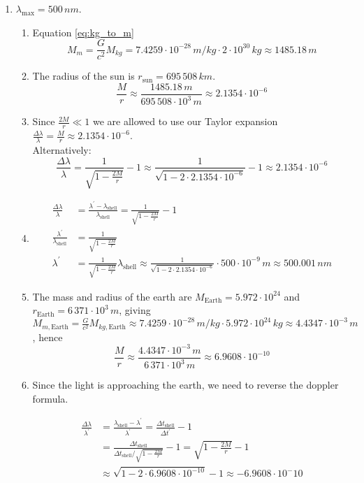 \documentclass[a4paper,10pt,english]{article}
\begin{document}
\begin{enumerate}
\item $\lambda_{\text{max}}=500\,nm$.

\begin{enumerate}

\item Equation \ref{eq:kg_to_m} \[M_{m}=\frac{G}{c^{2}}M_{kg}=7.4259\cdot10^{-28}\,m/kg\cdot2\cdot10^{30}\,kg\approx1485.18\,m\]

\item The radius of the sun is $r_{\text{sun}}=695\,508\,km$. \[\frac{M}{r}\approx\frac{1485.18\,m}{695\,508\cdot10^{3}\,m}\approx2.1354\cdot10^{-6}\]

\item Since $\frac{2M}{r}\ll 1$ we are allowed to use our Taylor expansion $\frac{\Delta \lambda}{\lambda}=\frac{M}{r}\approx2.1354\cdot10^{-6}$.
\\
Alternatively:
\begin{equation*}
\frac{\Delta \lambda}{\lambda}=\frac{1}{\sqrt{1-\frac{2M}{r}}}-1\approx\frac{1}{\sqrt{1-2\cdot2.1354\cdot10^{-6}}}-1\approx2.1354\cdot10^{-6}
\end{equation*}
  
\item

\begin{align*}
\frac{\Delta \lambda}{\lambda}&=\frac{\lambda^{\prime}-\lambda_{\text{shell}}}{\lambda_{\text{shell}}}=\frac{1}{\sqrt{1-\frac{2M}{r}}}-1\\
\frac{\lambda^{\prime}}{\lambda_{\text{shell}}}&=\frac{1}{\sqrt{1-\frac{2M}{r}}}\\
\lambda^{\prime}&=\frac{1}{\sqrt{1-\frac{2M}{r}}}\lambda_{\text{shell}}\approx\frac{1}{\sqrt{1-2\cdot2.1354\cdot10^{-6}}}\cdot500\cdot10^{-9}\,m\approx500.001\,nm
\end{align*}
  
\item The mass and radius of the earth are $M_{\text{Earth}}=5.972\cdot10^{24}$ and $r_{\text{Earth}}=6\,371\cdot10^{3}\,m$, giving $M_{m,\text{Earth}}=\frac{G}{c^{2}}M_{kg,\text{Earth}}\approx7.4259\cdot10^{-28}\,m/kg\cdot5.972\cdot10^{24}\,kg\approx4.4347\cdot10^{-3}\,m$, hence \[\frac{M}{r}\approx\frac{4.4347\cdot10^{-3}\,m}{6\,371\cdot10^{3}\,m}\approx6.9608\cdot10^{-10}\]
  
\item Since the light is approaching the earth, we need to reverse the doppler formula.

\begin{align*}
\frac{\Delta \lambda}{\lambda^{\prime}}&=\frac{\lambda_{\text{shell}}-\lambda^{\prime}}{\lambda^{\prime}}=\frac{\Delta t_{\text{shell}}}{\Delta t^{\prime}}-1\\
&=\frac{\Delta t_{\text{shell}}}{\Delta t_{\text{shell}}/\sqrt{1-\frac{2M}{r}}}-1=\sqrt{1-\frac{2M}{r}}-1\\
&\approx\sqrt{1-2\cdot6.9608\cdot10^{-10}}-1\approx-6.9608\cdot10^-{10}
\end{align*}


\end{enumerate}
\end{enumerate}
\end{document}
